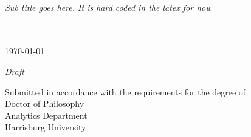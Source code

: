 \pagestyle{empty}


\begin{center}
{\Huge \textcolor{smartblue}{{\textsc{\MakeTextUppercase{{\thetitle}}}}}\\}

\textit{Sub title goes here. It is hard coded in the latex for now}

\vskip 1in
{\LARGE {}}\\
\vskip 0.75in
\theauthor \\
\monthyeardate\today

\vskip 0.25in
\textit{Draft} \\

\vskip 0.75in

Submitted in accordance with the requirements for the degree of\\Doctor of Philosophy \\[2ex]
Analytics Department \\[-1.5ex]
Harrisburg University

\vfill

\end{center}

\makeatletter
